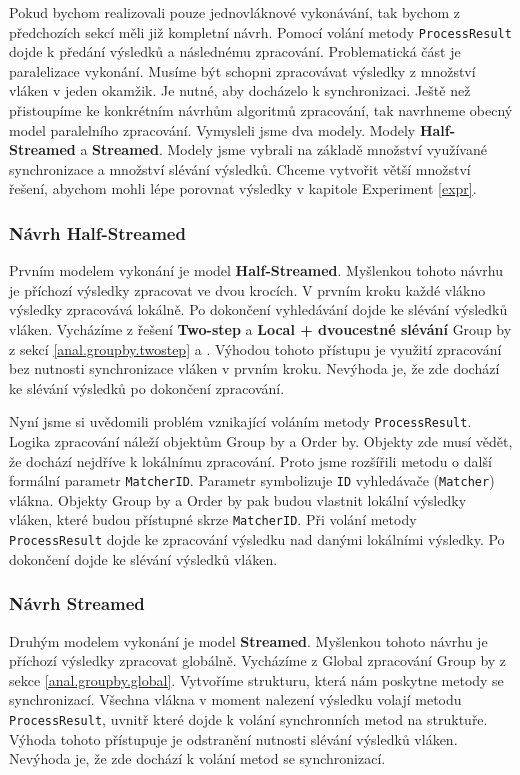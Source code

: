 Pokud bychom realizovali pouze jednovláknové vykonávání, tak bychom z předchozích sekcí měli již kompletní návrh.
Pomocí volání metody \texttt{ProcessResult} dojde k předání výsledků a následnému zpracování.
Problematická část je paralelizace vykonání.
Musíme být schopni zpracovávat výsledky z množství vláken v jeden okamžik.
Je nutné, aby docházelo k synchronizaci.
Ještě než přistoupíme ke konkrétním návrhům algoritmů zpracování, tak navrhneme obecný model paralelního zpracování.
Vymysleli jsme dva modely.
Modely \textbf{Half-Streamed} a \textbf{Streamed}.
Modely jsme vybrali na základě množství využívané synchronizace a množství slévání výsledků.
Chceme vytvořit větší množství řešení, abychom mohli lépe porovnat výsledky v kapitole Experiment \ref{expr}.

\subsubsection{Návrh Half-Streamed}

Prvním modelem vykonání je model \textbf{Half-Streamed}.
Myšlenkou tohoto návrhu je příchozí výsledky zpracovat ve dvou krocích.
V prvním kroku každé vlákno výsledky zpracovává lokálně.
Po dokončení vyhledávání dojde ke slévání výsledků vláken.
Vycházíme z řešení \textbf{Two-step} a \textbf{Local + dvoucestné slévání} Group by z sekcí \ref{anal.groupby.twostep} a \label{anal.groupby.local}.
Výhodou tohoto přístupu je využití zpracování bez nutnosti synchronizace vláken v prvním kroku.
Nevýhoda je, že zde dochází ke slévání výsledků po dokončení zpracování.

Nyní jsme si uvědomili problém vznikající voláním metody \texttt{ProcessResult}.
Logika zpracování náleží objektům Group by a Order by.
Objekty zde musí vědět, že dochází nejdříve k lokálnímu zpracování.
Proto jsme rozšířili metodu o další formální parametr \texttt{MatcherID}.
Parametr symbolizuje \texttt{ID} vyhledávače (\texttt{Matcher}) vlákna.
Objekty Group by a Order by pak budou vlastnit lokální výsledky vláken, které budou přístupné skrze \texttt{MatcherID}.
Při volání metody \texttt{ProcessResult} dojde ke zpracování výsledku nad danými lokálními výsledky.
Po dokončení dojde ke slévání výsledků vláken.

\subsubsection{Návrh Streamed}

Druhým modelem vykonání je model \textbf{Streamed}.
Myšlenkou tohoto návrhu je příchozí výsledky zpracovat globálně.
Vycházíme z Global zpracování Group by z sekce \ref{anal.groupby.global}.
Vytvoříme strukturu, která nám poskytne metody se synchronizací.
Všechna vlákna v moment nalezení výsledku volají metodu \texttt{ProcessResult}, uvnitř které dojde k volání synchronních metod na struktuře.
Výhoda tohoto přístupuje je odstranění nutnosti slévání výsledků vláken.
Nevýhoda je, že zde dochází k volání metod se synchronizací.

